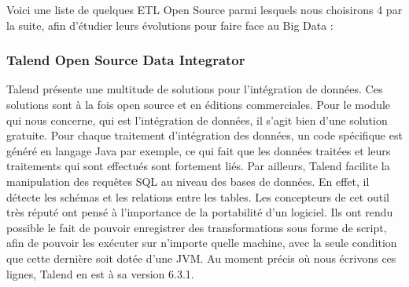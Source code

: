 \documentclass[12pt,a4wide,twoside]{report}
\begin{document}
Voici une liste de quelques ETL Open Source parmi lesquels nous choisirons 4 par la suite, afin d’étudier leurs évolutions pour faire face au Big Data :

\subsubsection{Talend Open Source Data Integrator}
Talend présente une multitude de solutions pour l’intégration de données. Ces solutions sont à la fois open source et en éditions commerciales. Pour le module qui nous concerne, qui est l’intégration de données, il s’agit bien d’une solution gratuite.\newline
Pour chaque traitement d’intégration des données, un code spécifique est généré en langage Java par exemple, ce qui fait que les données traitées et leurs traitements qui sont effectués sont fortement liés. \newline
Par ailleurs, Talend facilite la manipulation des requêtes SQL au niveau des bases de données. En effet, il détecte les schémas et les relations entre les tables.
Les concepteurs de cet outil très réputé ont pensé à l’importance de la portabilité d’un logiciel. Ils ont rendu possible le fait de pouvoir enregistrer des transformations sous forme de script, afin de pouvoir les exécuter sur n’importe quelle machine, avec la seule condition que cette dernière soit dotée d’une JVM. \newline
Au moment précis où nous écrivons ces lignes, Talend en est à sa version 6.3.1.
\end{document}
